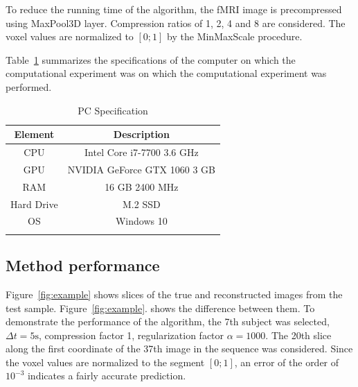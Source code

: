 \documentclass[sn-mathphys-num]{sn-jnl}%
\newcommand{\myfigref}[2]{~\ref{#1}.\subref{#2}}%
\theoremstyle{thmstyleone}%
\theoremstyle{thmstyletwo}%
\theoremstyle{thmstylethree}%
\begin{document}
To reduce the running time of the algorithm, the fMRI image is precompressed
using MaxPool3D layer. Compression ratios of 1, 2, 4 and 8 are considered.
The voxel values are normalized to $[0; 1]$ by the MinMaxScale procedure.

Table~\ref{table:pc} summarizes the specifications of the computer on which the computational experiment was
on which the computational experiment was performed.

\begin{table}[h!]
\caption{PC Specification}\label{table:pc}
\begin{tabular}{@{}cc@{}}
\toprule
Element & Description \\
\midrule
CPU & Intel Core i7-7700 3.6 GHz \\
GPU & NVIDIA GeForce GTX 1060 3 GB \\
RAM & 16 GB 2400 MHz \\
Hard Drive & M.2 SSD \\
OS & Windows 10 \\
\botrule
\end{tabular}
\end{table}

\subsection{Method performance}

Figure~\ref*{fig:example} shows slices of the true and reconstructed images from the test sample.
Figure\myfigref{fig:example}{fig:example-c} shows the difference between them.
To demonstrate the performance of the algorithm, the 7th subject was selected, $\Delta t = 5 \text{s}$, compression factor 1, regularization factor
$\alpha = 1000$. The 20th slice along the first coordinate of the 37th image in the sequence was considered.
Since the voxel values are normalized to the segment $[0; 1]$, an error of the order of $10^{-3}$
indicates a fairly accurate prediction.
\end{document}
